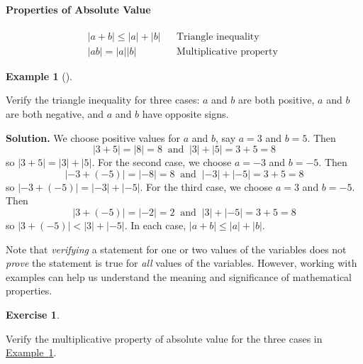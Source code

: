 \documentclass[10pt,]{book}
\theoremstyle{plain}
\theoremstyle{definition}
\theoremstyle{definition}
\theoremstyle{definition}
\newtheorem{example}[theorem]{Example}
\theoremstyle{definition}
\theoremstyle{definition}
\newtheorem{exercise}[theorem]{Exercise}
\numberwithin{equation}{section}
\newcommand\abs[1]{\left|#1\right|}
\newcommand{\lt}{ < }
\newcommand{\amp}{ & }
\begin{document}
\paragraph[Properties of Absolute Value]{Properties of Absolute Value}\label{paragraphs-26}
\begin{align}
\abs{a + b} \le \abs{a} + \abs{b} \amp\amp \text{Triangle inequality}\\
\abs{a  b} = \abs{a}  \abs{b} \amp\amp \text{Multiplicative property }
\end{align}%
\begin{example}[]\label{example-triangle-inequality}

        Verify the triangle inequality for three cases: \(a\) and \(b\) are both positive, \(a\) and \(b\) are both negative, and \(a\) and \(b\) have opposite signs.
\par\medskip\noindent%
\textbf{Solution.}\quad 
    We choose positive values for \(a\) and \(b\), say \(a = 3\) and \(b = 5\). Then 
    \begin{equation*}\abs{3 + 5} = \abs{8} = 8 ~\text{ and } ~ \abs{3}+\abs{5}= 3 + 5 = 8\end{equation*}
    so \(\abs{3 + 5} = \abs{3} + \abs{5}\). For the second case, we choose \(a = −3\) and \(b = −5\). Then
    \begin{equation*}\abs{−3 + (−5)} = \abs{−8} = 8 ~\text{ and } ~ \abs{−3}+\abs{−5} = 3 + 5 = 8\end{equation*}
    so \(\abs{−3 + (−5)} =\abs{−3}+\abs{−5}\). For the third case, we choose \(a = 3\) and \(b = −5\). Then
    \begin{equation*}\abs{3 + (−5)}=\abs{−2} = 2  ~\text{ and } ~ \abs{3}+\abs{−5}=3 + 5 = 8\end{equation*}
    so \(\abs{3 + (−5)} \lt \abs{3}+\abs{−5}\). In each case, \(\abs{a + b}\le\abs{a} +\abs{b}\).
\end{example}
\par

    Note that \emph{verifying} a statement for one or two values of the variables does not \emph{prove} the statement is true for \emph{all} values of the variables. However, working with examples can help us understand the meaning and significance of mathematical properties.
%
\begin{exercise}\label{exercise-abs-multiplicative-property}

    Verify the multiplicative property of absolute value for the three cases in \hyperref[example-triangle-inequality]{Example~\ref{example-triangle-inequality}}.
\end{exercise}
\typeout{************************************************}
\typeout{************************************************}
\end{document}
